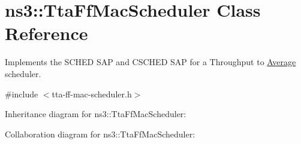 \hypertarget{classns3_1_1TtaFfMacScheduler}{}\section{ns3\+:\+:Tta\+Ff\+Mac\+Scheduler Class Reference}
\label{classns3_1_1TtaFfMacScheduler}


Implements the S\+C\+H\+ED S\+AP and C\+S\+C\+H\+ED S\+AP for a Throughput to \hyperlink{classns3_1_1Average}{Average} scheduler.  




{\ttfamily \#include $<$tta-\/ff-\/mac-\/scheduler.\+h$>$}



Inheritance diagram for ns3\+:\+:Tta\+Ff\+Mac\+Scheduler\+:


Collaboration diagram for ns3\+:\+:Tta\+Ff\+Mac\+Scheduler\+:
